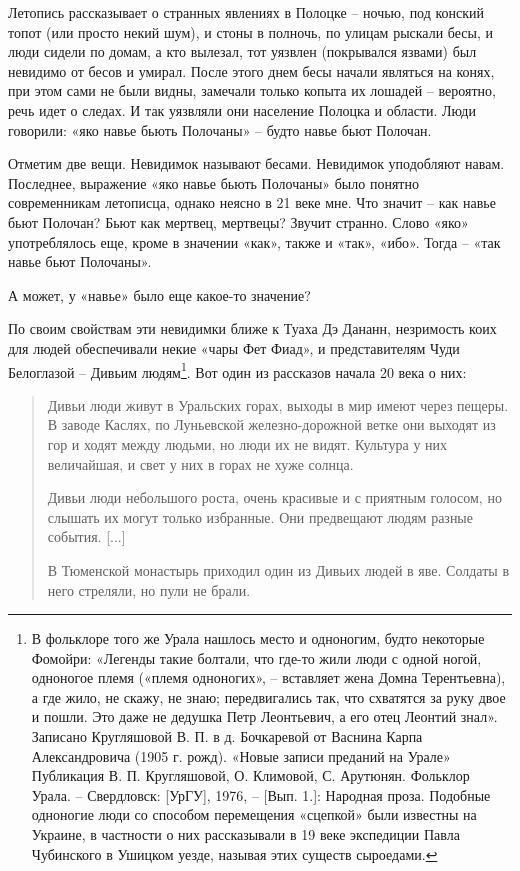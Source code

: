 Летопись рассказывает о странных явлениях в Полоцке – ночью, под конский топот (или просто некий шум), и стоны в полночь, по улицам рыскали бесы, и люди сидели по домам, а кто вылезал, тот уязвлен (покрывался язвами) был невидимо от бесов и умирал. После этого днем бесы начали являться на конях, при этом сами не были видны, замечали только копыта их лошадей – вероятно, речь идет о следах. И так уязвляли они население Полоцка и области. Люди говорили: «яко навье бьють Полочаны» – будто навье бьют Полочан.

Отметим две вещи. Невидимок называют бесами. Невидимок уподобляют навам. Последнее, выражение «яко навье бьють Полочаны» было понятно современникам летописца, однако неясно в 21 веке мне. Что значит – как навье бьют Полочан? Бьют как мертвец, мертвецы? Звучит странно. Слово «яко» употреблялось еще, кроме в значении «как», также и «так», «ибо». Тогда – «так навье бьют Полочаны».

А может, у «навье» было еще какое-то значение? 

По своим свойствам эти невидимки ближе к Туаха Дэ Дананн, незримость коих для людей обеспечивали некие «чары Фет Фиад», и представителям Чуди Белоглазой – Дивьим людям\footnote{В фольклоре того же Урала нашлось место и одноногим, будто некоторые Фомойри: «Легенды такие болтали, что где-то жили люди с одной ногой, одноногое племя («племя одноногих», – вставляет жена Домна Терентьевна), а где жило, не скажу, не знаю; передвигались так, что схватятся за руку двое и пошли. Это даже не дедушка Петр Леонтьевич, а его отец Леонтий знал». Записано Кругляшовой В. П. в д. Бочкаревой от Васнина Карпа Александровича (1905 г. рожд). «Новые записи преданий на Урале» Публикация В. П. Кругляшовой, О. Климовой, С. Арутюнян. Фольклор Урала. – Свердловск: [УрГУ], 1976, – [Вып. 1.]: Народная проза. Подобные одноногие люди со способом перемещения «сцепкой» были известны на Украине, в частности о них рассказывали в 19 веке экспедиции Павла Чубинского в Ушицком уезде, называя этих существ сыроедами.}. Вот один из рассказов начала 20 века о них\cite{onuchkov01}:

\begin{quotation}
Дивьи люди живут в Уральских горах, выходы в мир имеют через пещеры. В заводе Каслях, по Луньевской железно-дорожной ветке они выходят из гор и ходят между людьми, но люди их не видят. Культура у них величайшая, и свет у них в горах не хуже солнца. 

Дивьи люди небольшого роста, очень красивые и с приятным голосом, но слышать их могут только избранные. Они предвещают людям разные события. [...]

В Тюменской монастырь приходил один из Дивьих людей в яве. Солдаты в него стреляли, но пули не брали.
\end{quotation}

